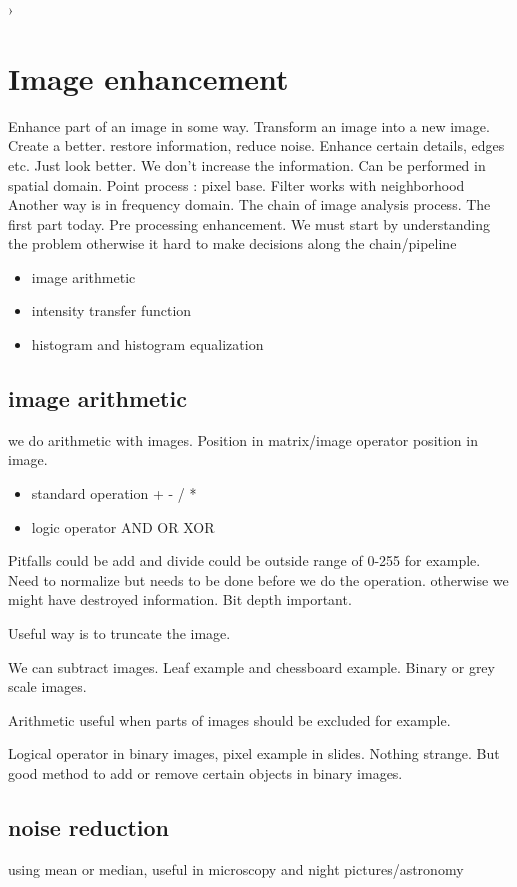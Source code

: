 ›
\section{Image enhancement}
Enhance part of an image in some way. Transform an image into a new image. Create a better. restore information, reduce noise.
Enhance certain details, edges etc. Just look better. 
We don't increase the information. Can be performed in spatial domain. Point process : pixel base. Filter works with neighborhood
Another way is in frequency domain. 
The chain of image analysis process. The first part today. Pre processing enhancement. We must start by understanding the problem otherwise it hard to make decisions along the chain/pipeline


\begin{itemize}
    \item image arithmetic
    \item intensity transfer function
    \item histogram and histogram equalization
\end{itemize}


\subsection{image arithmetic}
we do arithmetic with images. Position in matrix/image operator position in image. 

\begin{itemize}
    \item standard operation + - / *
    \item logic operator AND OR XOR
\end{itemize}

Pitfalls could be add and divide could be outside range of 0-255 for example. Need to normalize but needs to be done before we do the operation. otherwise we might have destroyed information. Bit depth important. 

Useful way is to truncate the image. 

We can subtract images. Leaf example and chessboard example. Binary or grey scale images. 

Arithmetic useful when parts of images should be excluded for example.

Logical operator in binary images, pixel example in slides. Nothing strange. But good method to add or remove certain objects in binary images. 

\subsection{noise reduction}
using mean or median, useful in microscopy and night pictures/astronomy


